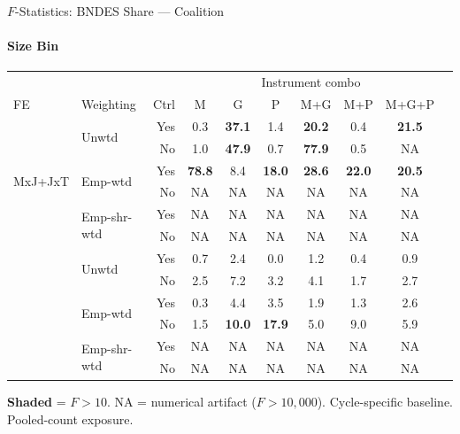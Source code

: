 \documentclass[aspectratio=169,10pt]{beamer}
\newcommand{\fpass}[1]{\cellcolor{pass}\textbf{#1}}
\begin{document}
\begin{frame}[t]{$F$-Statistics: BNDES Share --- Coalition}
\framesubtitle{Size Bin}
\begin{center}
\footnotesize
\setlength{\tabcolsep}{3.5pt}
\renewcommand{\arraystretch}{1.05}
\begin{tabular}{@{}llrccccccc@{}}
\toprule
 & & & \multicolumn{6}{c}{Instrument combo} \\
\cmidrule(l{2pt}r{2pt}){4-9}
FE & Weighting & Ctrl & M & G & P & M+G & M+P & M+G+P \\
\midrule
  \multirow{6}{*}{MxJ+JxT} & \multirow{2}{*}{Unwtd} & Yes & 0.3 & \fpass{37.1} & 1.4 & \fpass{20.2} & 0.4 & \fpass{21.5} \\
   &  & No & 1.0 & \fpass{47.9} & 0.7 & \fpass{77.9} & 0.5 & NA \\
   & \multirow{2}{*}{Emp-wtd} & Yes & \fpass{78.8} & 8.4 & \fpass{18.0} & \fpass{28.6} & \fpass{22.0} & \fpass{20.5} \\
   &  & No & NA & NA & NA & NA & NA & NA \\
   & \multirow{2}{*}{Emp-shr-wtd} & Yes & NA & NA & NA & NA & NA & NA \\
   &  & No & NA & NA & NA & NA & NA & NA \\
\addlinespace[5pt]
  \multirow{6}{*}{MxJ+MxT} & \multirow{2}{*}{Unwtd} & Yes & 0.7 & 2.4 & 0.0 & 1.2 & 0.4 & 0.9 \\
   &  & No & 2.5 & 7.2 & 3.2 & 4.1 & 1.7 & 2.7 \\
   & \multirow{2}{*}{Emp-wtd} & Yes & 0.3 & 4.4 & 3.5 & 1.9 & 1.3 & 2.6 \\
   &  & No & 1.5 & \fpass{10.0} & \fpass{17.9} & 5.0 & 9.0 & 5.9 \\
   & \multirow{2}{*}{Emp-shr-wtd} & Yes & NA & NA & NA & NA & NA & NA \\
   &  & No & NA & NA & NA & NA & NA & NA \\
\bottomrule
\end{tabular}
\end{center}
{\scriptsize \colorbox{pass}{\textbf{Shaded}} = $F>10$. NA = numerical artifact ($F>10{,}000$). Cycle-specific baseline. Pooled-count exposure.}
\end{frame}
\end{document}
